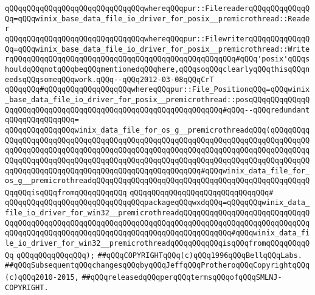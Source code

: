 \verb|qQQqqQQqqQQqqQQqqQQqqQQqqQQqqQQqwhereqQQqpur::FilereaderqQQqqQQqqQQqqQQq=qQQqwinix_base_data_file_io_driver_for_posix__premicrothread::Reader|\newline
\verb|qQQqqQQqqQQqqQQqqQQqqQQqqQQqqQQqwhereqQQqpur::FilewriterqQQqqQQqqQQqqQQq=qQQqwinix_base_data_file_io_driver_for_posix__premicrothread::WriterqQQqqQQqqQQqqQQqqQQqqQQqqQQqqQQqqQQqqQQqqQQqqQQqqQQq#qQQq'posix'qQQqshouldqQQqnotqQQqbeqQQqmentionedqQQqhere,qQQqsoqQQqclearlyqQQqthisqQQqneedsqQQqsomeqQQqwork.qQQq--qQQq2012-03-08qQQqCrT|\newline
\verb|qQQqqQQq#qQQqqQQqqQQqqQQqqQQqwhereqQQqpur::File_PositionqQQq=qQQqwinix_base_data_file_io_driver_for_posix__premicrothread::posqQQqqQQqqQQqqQQqqQQqqQQqqQQqqQQqqQQqqQQqqQQqqQQqqQQqqQQqqQQqqQQq#qQQq--qQQqredundant|\newline
\verb|qQQqqQQqqQQqqQQq=|\newline
\verb|qQQqqQQqqQQqqQQqwinix_data_file_for_os_g__premicrothreadqQQq(qQQqqQQqqQQqqQQqqQQqqQQqqQQqqQQqqQQqqQQqqQQqqQQqqQQqqQQqqQQqqQQqqQQqqQQqqQQqqQQqqQQqqQQqqQQqqQQqqQQqqQQqqQQqqQQqqQQqqQQqqQQqqQQqqQQqqQQqqQQqqQQqqQQqqQQqqQQqqQQqqQQqqQQqqQQqqQQqqQQqqQQqqQQqqQQqqQQqqQQqqQQqqQQqqQQqqQQqqQQqqQQqqQQqqQQqqQQqqQQqqQQqqQQqqQQqqQQqqQQqqQQq#qQQqwinix_data_file_for_os_g__premicrothreadqQQqqQQqqQQqqQQqqQQqqQQqqQQqqQQqqQQqqQQqqQQqqQQqqQQqqQQqisqQQqfromqQQqqQQqqQQq|\newline
\verb|qQQqqQQqqQQqqQQqqQQqqQQqqQQqqQQq#|\newline
\verb|qQQqqQQqqQQqqQQqqQQqqQQqqQQqqQQqpackageqQQqwxdqQQq=qQQqqQQqwinix_data_file_io_driver_for_win32__premicrothreadqQQqqQQqqQQqqQQqqQQqqQQqqQQqqQQqqQQqqQQqqQQqqQQqqQQqqQQqqQQqqQQqqQQqqQQqqQQqqQQqqQQqqQQqqQQqqQQqqQQqqQQqqQQqqQQqqQQqqQQqqQQqqQQqqQQqqQQqqQQqqQQqqQQqqQQq#qQQqwinix_data_file_io_driver_for_win32__premicrothreadqQQqqQQqqQQqisqQQqfromqQQqqQQqqQQq|\newline
\verb|qQQqqQQqqQQqqQQq);|\newline
\newline
\newline
\newline
\newline
\verb|##qQQqCOPYRIGHTqQQq(c)qQQq1996qQQqBellqQQqLabs.|\newline
\verb|##qQQqSubsequentqQQqchangesqQQqbyqQQqJeffqQQqProtheroqQQqCopyrightqQQq(c)qQQq2010-2015,|\newline
\verb|##qQQqreleasedqQQqperqQQqtermsqQQqofqQQqSMLNJ-COPYRIGHT.|\newline

